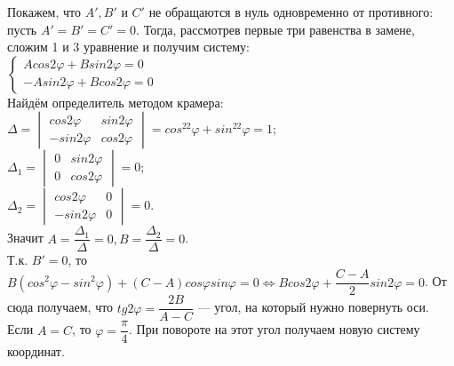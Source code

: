 \documentclass[a4paper, 12pt]{report}
\begin{document}
Покажем, что $A', B'$ и $C'$ не обращаются в нуль одновременно от противного: пусть $A' = B' = C' = 0$. Тогда, рассмотрев первые три равенства в замене, сложим 1 и 3 уравнение и получим систему:\\
$\begin{cases}
	Acos2\varphi + Bsin2\varphi = 0 \\
	-Asin2\varphi + Bcos2\varphi = 0
\end{cases}$\\
Найдём определитель методом крамера:\\
$\Delta = \begin{vmatrix}
	cos2\varphi & sin2\varphi \\
	-sin2\varphi & cos2\varphi
\end{vmatrix} = cos^22\varphi + sin^22\varphi = 1$;\\
$\Delta_1 =  \begin{vmatrix}
	0 & sin2\varphi \\
	0 & cos2\varphi
\end{vmatrix} = 0$;\\
$\Delta_2 =  \begin{vmatrix}
	cos2\varphi & 0 \\
	-sin2\varphi & 0
\end{vmatrix} = 0$.\\
Значит $A = \dfrac{\Delta_1}{\Delta} = 0, B = \dfrac{\Delta_2}{\Delta} = 0$.\\
Т.к. $B' = 0$, то $B(cos^2\varphi - sin^2\varphi) + (C - A)cos\varphi sin\varphi = 0 \Leftrightarrow Bcos2\varphi + \dfrac{C - A}{2}sin2\varphi = 0$. От сюда получаем, что $tg2\varphi = \dfrac{2B}{A - C}$ --- угол, на который нужно повернуть оси.\\
Если $A = C$, то $\varphi = \dfrac{\pi}{4}$. При повороте на этот угол получаем новую систему координат.\\
\end{document}
